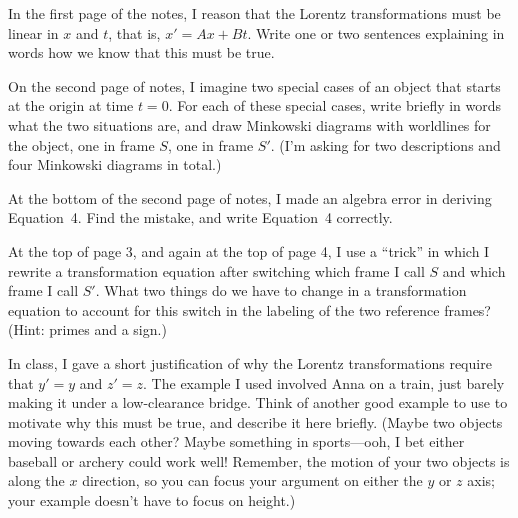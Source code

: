 \begin{Exercise}
\label{first_lorentz_derivation_prob}
In the first page of the notes, I reason that the Lorentz transformations must be linear in $x$ and $t$, that is, $x'=Ax+Bt$.  Write one or two sentences explaining in words how we know that this must be true.
\end{Exercise}

\begin{Exercise}
On the second page of notes, I imagine two special cases of an object that starts at the origin at time $t=0$.  For each of these special cases, write briefly in words what the two situations are, and draw Minkowski diagrams with worldlines for the object, one in frame $S$, one in frame $S'$.  (I'm asking for two descriptions and four Minkowski diagrams in total.)
\end{Exercise}

\begin{Exercise}
At the bottom of the second page of notes, I made an algebra error in deriving Equation~4.  Find the mistake, and write Equation~4 correctly.
\end{Exercise}

\begin{Exercise}
\label{fourth_lorentz_derivation_prob}
At the top of page 3, and again at the top of page 4, I use a ``trick'' in which I rewrite a transformation equation after switching which frame I call $S$ and which frame I call $S'$.  What two things do we have to change in a transformation equation to account for this switch in the labeling of the two reference frames?  (Hint: primes and a sign.)
\end{Exercise}

\begin{Exercise}
In class, I gave a short justification of why the Lorentz transformations require that $y'=y$ and $z'=z$.  The example I used involved Anna on a train, just barely making it under a low-clearance bridge.  Think of another good example to use to motivate why this must be true, and describe it here briefly.  (Maybe two objects moving towards each other?  Maybe something in sports---ooh, I bet either baseball or archery could work well!  Remember, the motion of your two objects is along the $x$ direction, so you can focus your argument on either the $y$ or $z$ axis; your example doesn't have to focus on height.)
\end{Exercise}


